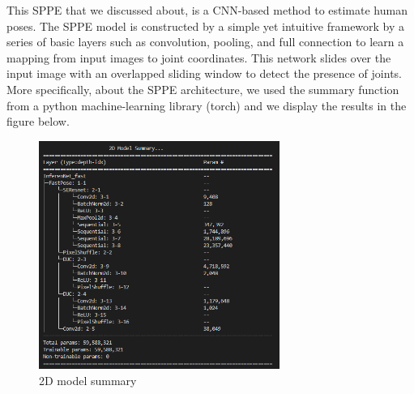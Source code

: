 This SPPE that we discussed about, is a CNN-based method to estimate human poses. The SPPE model is constructed by a simple yet intuitive framework by a series of basic layers such as convolution, pooling, and full connection to learn a mapping from input images to joint coordinates. This network slides over the input image with an overlapped sliding window to detect the presence of joints. More specifically, about the SPPE architecture, we used the summary function from a python machine-learning library (torch) and we display the results in the figure below.

\begin{figure}[h]
	\centering
	\includegraphics[width=0.7\textwidth]{figures/Implementation/2DModelAr.png}
	\captionsetup{labelformat=empty}
	\caption{2D model summary}
\end{figure}

\pagebreak


